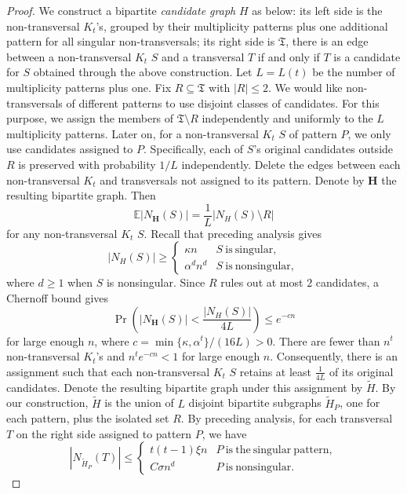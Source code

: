 \documentclass[11pt]{article}
\numberwithin{equation}{section}
\theoremstyle{remark}
\begin{document}
\begin{proof}
We construct a bipartite \emph{candidate graph} \(H\) as below: its left side is the non-transversal \(K_t\)'s,
grouped by their multiplicity patterns plus one additional pattern for all singular non-transversals;
its right side is \(\mathfrak T\), there is an edge between a non-transversal \(K_t\) \(S\) and a transversal \(T\)
if and only if \(T\) is a candidate for \(S\) obtained through the above construction.
Let \(L=L(t)\) be the number of multiplicity patterns plus one.
Fix \(R\subseteq\mathfrak T\) with \(|R|\le2\). We would like non-transversals of different patterns to use
disjoint classes of candidates. For this purpose, we assign the members of \(\mathfrak T\setminus R\) independently
and uniformly to the \(L\) multiplicity patterns. Later on, for a non-transversal \(K_t\) \(S\) of pattern \(P\),
we only use candidates assigned to \(P\). Specifically, each of \(S\)'s original candidates outside \(R\) is preserved
with probability \(1/L\) independently. Delete the edges between each non-transversal \(K_t\) and
transversals not assigned to its pattern. Denote by \(\mathbf H\) the resulting bipartite graph. Then
\begin{equation*}
\mathbb E|N_{\mathbf H}(S)|=\frac{1}{L}\left|N_{H}(S)\setminus R\right|
\end{equation*}
for any non-transversal \(K_t\) \(S\). Recall that preceding analysis gives
\begin{equation*}
  |N_H(S)|\ge
  \begin{cases}
    \kappa n & S  \mathrm{\ is\ singular},\\
    \alpha^dn^d & S \mathrm{\ is\ nonsingular},
  \end{cases}
\end{equation*}
where \(d\ge1\) when \(S\) is nonsingular. Since \(R\) rules out at most \(2\) candidates, a Chernoff bound gives
\begin{equation*}
  \Pr\left(|N_{\mathbf{H}}(S)|<\frac{|N_H(S)|}{4L}\right)\le e^{-cn}
\end{equation*}
for large enough \(n\), where \(c=\min\{\kappa,\alpha^t\}/(16L)>0\). There are fewer than \(n^t\) non-transversal
\(K_t\)'s and \(n^te^{-cn}<1\) for large enough \(n\). Consequently, there is an assignment such that each
non-transversal \(K_t\) \(S\) retains at least \(\frac{1}{4L}\) of its original candidates.
Denote the resulting bipartite graph under this assignment by \(\widetilde{H}\). By our construction,
\(\widetilde{H}\) is the union of \(L\) disjoint bipartite subgraphs \(\widetilde{H}_P\), one for each pattern,
plus the isolated set \(R\). By preceding analysis, for each transversal \(T\) on the right side assigned to pattern \(P\), we have
\begin{equation*}
  |N_{\widetilde{H}_P}(T)|\le
  \begin{cases}
    t(t-1)\xi n & P  \mathrm{\ is\ the\ singular\ pattern},\\
    C\sigma n^d & P \mathrm{\ is\ nonsingular}.
  \end{cases}
\end{equation*}


\end{proof}
\end{document}
